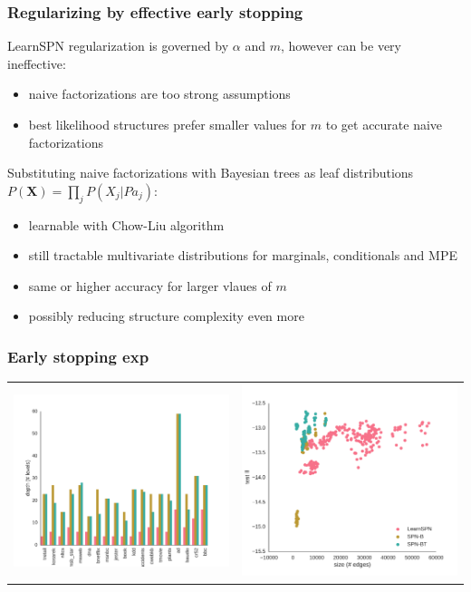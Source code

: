 \documentclass[xcolor={usenames,dvipsnames,svgnames}, compress]{beamer}
\begin{document}
\begin{frame}
  \frametitle{Regularizing by effective early stopping}
  \footnotesize
  LearnSPN regularization is governed by $\alpha$ and $m$, however can
  be very ineffective:
  \begin{itemize}
  \item naive factorizations are too strong assumptions
    \item best likelihood structures prefer smaller values for $m$ to
      get accurate naive factorizations
    \end{itemize}\bigskip

    Substituting naive factorizations with Bayesian trees as leaf
    distributions $P(\mathbf{X}) = \prod_{j}P(X_j|Pa_{j})$:
    \begin{itemize}
    \item learnable with Chow-Liu algorithm
    \item still tractable multivariate distributions for marginals,
      conditionals and MPE
    \item same or higher accuracy for larger vlaues of $m$
    \item possibly reducing structure complexity even more  
    \end{itemize}
\end{frame}

\begin{frame}
  \frametitle{Early stopping exp}
  \begin{table}[ht]
    \centering
    \begin{tabular}{c c}
      \includegraphics[width=0.45\linewidth]{figures/levels-comp}&\includegraphics[width=0.45\linewidth]{figures/plants-ll-depth}
    \end{tabular}
  \end{table}

\end{frame}
\end{document}
